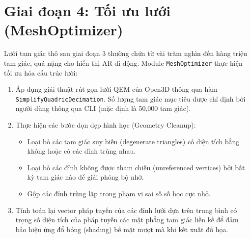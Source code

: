 \documentclass[a4paper,12pt]{report}
\begin{document}
\section{Giai đoạn 4: Tối ưu lưới (MeshOptimizer)}
Lưới tam giác thô sau giai đoạn 3 thường chứa từ vài trăm nghìn đến hàng triệu tam giác, quá nặng cho hiển thị AR di động. Module \texttt{MeshOptimizer} thực hiện tối ưu hóa cấu trúc lưới:
\begin{enumerate}
    \item Áp dụng giải thuật rút gọn lưới QEM của Open3D thông qua hàm \texttt{SimplifyQuadricDecimation}. Số lượng tam giác mục tiêu được chỉ định bởi người dùng thông qua CLI (mặc định là 50,000 tam giác).
    \item Thực hiện các bước dọn dẹp hình học (Geometry Cleanup):
    \begin{itemize}
        \item Loại bỏ các tam giác suy biến (degenerate triangles) có diện tích bằng không hoặc có các đỉnh trùng nhau.
        \item Loại bỏ các đỉnh không được tham chiếu (unreferenced vertices) bởi bất kỳ tam giác nào để giải phóng bộ nhớ.
        \item Gộp các đỉnh trùng lặp trong phạm vi sai số số học cực nhỏ.
    \end{itemize}
    \item Tính toán lại vector pháp tuyến của các đỉnh lưới dựa trên trung bình có trọng số diện tích của pháp tuyến các mặt phẳng tam giác liền kề để đảm bảo hiệu ứng đổ bóng (shading) bề mặt mượt mà khi kết xuất đồ họa.
\end{enumerate}
\end{document}
